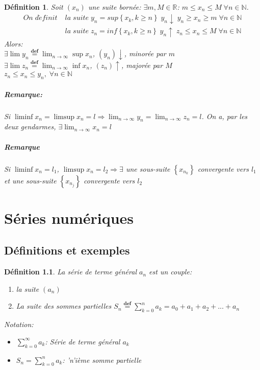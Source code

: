 \documentclass[10pt,a4paper]{book}
\newcommand{\R}{\mathbb{R}}
\newcommand{\N}{\mathbb{N}}
\newtheorem{definition}{Définition}[section]
\begin{document}
\begin{definition}
Soit $(x_n)$ une suite bornée: $\exists m,M\in \R$: $m\leq x_n\leq M \; \forall n\in \N$. 
\begin{align*}
On\; d\acute{e}finit\; & la\; suite\; y_n = sup\left\lbrace x_k, k\geq n\right\rbrace \; y_n\downarrow \; y_n \geq x_n \geq m \; \forall n \in \N \\
& la\; suite\; z_n = inf\left\lbrace x_k, k\geq n\right\rbrace \; y_n\uparrow \; z_n \leq x_n \leq M \; \forall n \in \N
\end{align*}
Alors: \\
$\exists \lim y_n \overset{\mathbf{def}}{=} \lim_{n\rightarrow \infty}\sup x_n$, $(y_n)\downarrow$, minorée par $m$ \\
$\exists \lim z_n \overset{\mathbf{def}}{=} \lim_{n\rightarrow \infty}\inf x_n$, $(z_n)\uparrow$, majorée par $M$ \\
$z_n \leq x_n \leq y_n,\; \forall n\in \N$ \\
\paragraph{Remarque:} Si $\liminf x_n = \limsup x_n = l \Rightarrow \lim_{n\rightarrow \infty} y_n = \lim_{n\rightarrow \infty} z_n = l$. On a, par les deux gendarmes, $\exists \lim_{n\rightarrow \infty} x_n = l$
\paragraph{Remarque} Si $\liminf x_n = l_1$, $\limsup x_n = l_2 \Rightarrow \exists$ une sous-suite $\left\lbrace x_{n_k}\right\rbrace$ convergente vers $l_1$ et une sous-suite $\left\lbrace x_{n_j}\right\rbrace$ convergente vers $l_2$ 
\end{definition}

\chapter{Séries numériques}

\section{Définitions et exemples}

\begin{definition} La série de terme général $a_n$ est un couple:
\begin{enumerate}
\item la suite $(a_n)$
\item La suite des sommes partielles $S_n \overset{\mathbf{def}}{=} \sum^n_{k=0} a_k = a_0 + a_1 + a_2 + ... + a_n$
\end{enumerate}
Notation: 
\begin{itemize}
\item $\sum^{\infty}_{k=0}a_k$: Série de terme général $a_k$
\item $S_n = \sum^{n}_{k=0}a_k$: 'n'ième somme partielle
\end{itemize}
\end{definition}
\end{document}
